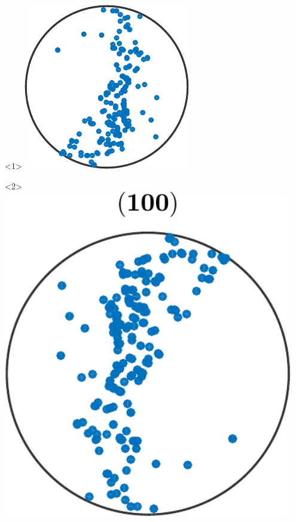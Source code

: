 \documentclass[compress]{beamer}
\begin{document}
\begin{frame}[fragile]
\begin{columns}
\begin{column}{3.5cm}
      \begin{onlyenv}<1>
        \includegraphics[width=\textwidth]{pic/pfSimple}
      \end{onlyenv}

      \begin{onlyenv}<2>
        \includegraphics[width=0.95\textwidth]{pic/pfSimple100}


\end{onlyenv}
\end{column}
\end{columns}
\end{frame}
\end{document}

